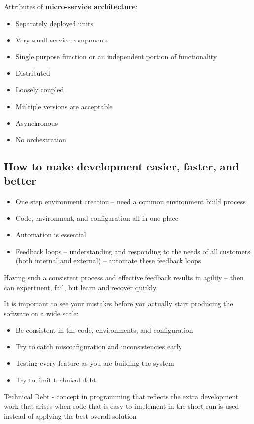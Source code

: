 \documentclass[a4paper]{article}
\begin{document}
Attributes of \textbf{micro-service architecture}:
\begin{itemize}
\item Separately deployed units
\item Very small service components
\item Single purpose function or an independent portion of functionality
\item Distributed
\item Loosely coupled
\item Multiple versions are acceptable
\item Asynchronous
\item No orchestration
\end{itemize}

\subsection{How to make development easier, faster, and better}
\begin{itemize}
\item One step environment creation – need a common environment build process
\item Code, environment, and configuration all in one place
\item Automation is essential
\item Feedback loops – understanding and responding to the needs of all customers (both internal and external) – automate these feedback loops
\end{itemize}
Having such a consistent process and effective feedback results in agility – then can experiment, fail, but learn and recover quickly.

It is important to see your mistakes before you actually start producing the software on a wide scale: 
\begin{itemize}
\item Be consistent in the code, environments, and configuration
\item Try to catch misconfiguration and inconsistencies early
\item Testing every feature as you are building the system
\item Try to limit technical debt 
\end{itemize}
Technical Debt - concept in programming that reflects the extra development work that arises when code that is easy to implement in the short run is used instead of applying the best overall solution
\end{document}
